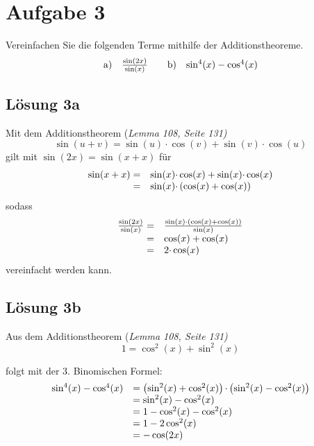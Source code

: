 \section{Aufgabe 3}

Vereinfachen Sie die folgenden Terme mithilfe der Additionstheoreme.
\begin{align*}
	\begin{array}{ l c }
		\text{a)} & \frac{\sin( 2x)}{\sin( x)}
	\end{array} & & \begin{array}{ l c }
		\text{b)} & \sin^{4}( x) -\cos^{4}( x)
	\end{array}
\end{align*}


\subsection{Lösung 3a}

Mit dem Additionstheorem (\textit{Lemma 108, Seite 131)}
\begin{equation*}
	\sin( u+v) =\sin( u) \cdotp \cos( v) +\sin( v) \cdotp \cos( u)
\end{equation*}
gilt mit $\displaystyle \sin( 2x) =\sin( x+x)$ für
\begin{equation*}
	\begin{array}{ r l }
		\sin( x+x) = & \sin( x) \cdotp \cos( x) +\sin( x) \cdotp \cos( x)\\
		= & \sin( x) \cdotp (\cos( x) +\cos( x))
	\end{array}
\end{equation*}
sodass
\begin{equation*}
	\begin{array}{ r l }
		\frac{\sin( 2x)}{\sin( x)} = & \frac{\sin( x) \cdotp (\cos( x) +\cos( x))}{\sin( x)}\\
		= & \cos( x) +\cos( x)\\
		= & 2\cdotp \cos( x)
	\end{array}
\end{equation*}
vereinfacht werden kann. 



\subsection{Lösung 3b}
Aus dem Additionstheorem (\textit{Lemma 108, Seite 131)}\begin{equation*}
	1=\cos^{2}( x) +\sin^{2}( x)
\end{equation*}

folgt mit der 3. Binomischen Formel:
\begin{equation*}
	\begin{array}{ c l }
		\sin^{4}( x) -\cos^{4}( x) & =\left(\sin^{2}( x) +\cos^{2}( x)\right) \cdotp \left(\sin^{2}( x) -\cos^{2}( x)\right)\\
		& =\sin^{2}( x) -\cos^{2}( x)\\
		& =1-\cos^{2}( x) -\cos^{2}( x)\\
		& =1-2\cos^{2}( x)\\
		& =-\cos( 2x)
	\end{array}
\end{equation*}

